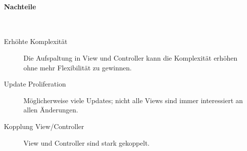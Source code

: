 \documentclass[ngerman]{tuda_summary}
\begin{document}
\paragraph{Nachteile}\mbox{}\\
\begin{description}
    \item[Erhöhte Komplexität] Die Aufspaltung in View und Controller kann die Komplexität erhöhen ohne mehr Flexibilität zu gewinnen.
    \item[Update Proliferation] Möglicherweise viele Updates; nicht alle Views sind immer interessiert an allen Änderungen.
    \item[Kopplung View/Controller] View und Controller sind stark gekoppelt.
\end{description}
\clearpage


\clearpage
\end{document}
